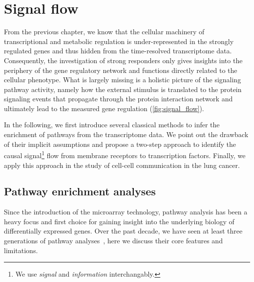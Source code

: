 \chapter{Signal flow}
\label{chap:flow}

From the previous chapter, we know that the cellular machinery of 
transcriptional and metabolic regulation is under-represented in the strongly 
regulated genes and thus hidden from the time-resolved transcriptome data. 
Consequently, the investigation of strong responders only gives insights into
the periphery of the gene regulatory network and functions directly related
to the cellular phenotype. What is largely missing is a holistic picture of
the signaling pathway activity, namely how the external stimulus is translated
to the protein signaling events that propagate through the protein interaction
network and ultimately lead to the measured gene regulation (\ref{fig:signal_flow}).

In the following, we first introduce several classical methods to infer the
enrichment of pathways from the transcriptome data. We point out the drawback
of their implicit assumptions and propose a two-step approach to identify the
causal signal\footnote{We use \emph{signal} and \emph{information} interchangably.} 
flow from membrane receptors to transcription factors. Finally,
we apply this approach in the study of cell-cell communication in the lung
cancer.

\section{Pathway enrichment analyses}
Since the introduction of the microarray technology, pathway analysis has been 
a heavy focus and first choice for gaining insight into the underlying biology 
of differentially expressed genes. Over the past decade, we have seen at least 
three generations of pathway analyses~\citep{Khatri2012}, here we discuss 
their core features and limitations.

